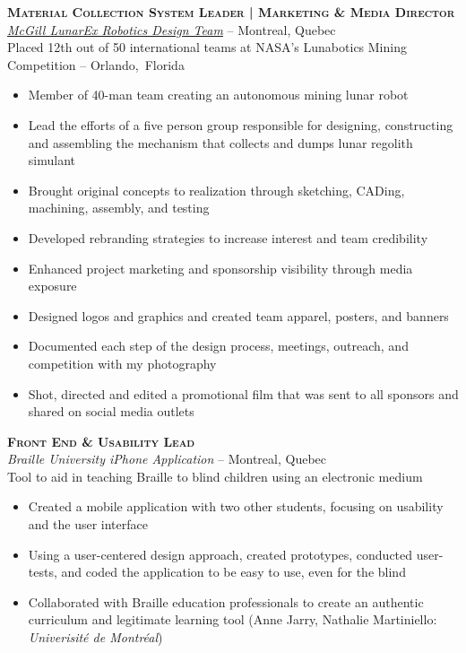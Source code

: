 \documentclass[12pt, letterpaper]{article}
\newcommand{\years}[1]{\marginnote{\scriptsize #1}} %
\begin{document}
\clearpage

\begin{samepage}
\years{\small 8/2012 - 8/2013} \textbf{\scshape Material Collection System Leader | Marketing \& Media Director}\\
\href{http://www.lunarex.mcgill.ca}{\textit{McGill LunarEx Robotics Design Team}} -- Montreal, Quebec\\
\small Placed 12th out of 50 international teams at NASA's Lunabotics Mining Competition -- Orlando,~Florida
\begin{itemize}
\item Member of 40-man team creating an autonomous mining lunar robot 
\item Lead the efforts of a five person group responsible for designing, constructing and assembling the mechanism that collects and dumps lunar regolith simulant
\item Brought original concepts to realization through sketching, CADing, machining, assembly, and testing
\item Developed rebranding strategies to increase interest and team credibility
\item Enhanced project marketing and sponsorship visibility through media exposure
\item Designed logos and graphics and created team apparel, posters, and banners
\item Documented each step of the design process,  meetings, outreach, and competition with my photography
\item Shot, directed and edited a promotional film that was sent to all sponsors and shared on social media outlets
\end{itemize}
\end {samepage}

\begin{samepage}
\years{\small 1/2013 - 8/2013} \textbf{\scshape Front End \& Usability Lead}\\
\textit{Braille University iPhone Application} -- Montreal, Quebec\\
\small Tool to aid in teaching Braille to blind children using an electronic medium 
\begin{itemize}
\item Created a mobile application with two other students, focusing on usability and the user interface
\item Using a user-centered design approach, created prototypes, conducted user-tests, and coded the application to be easy to use, even for the blind
\item Collaborated with Braille education professionals to create an authentic curriculum and legitimate learning tool (Anne Jarry, Nathalie Martiniello: \textit {Univerisit\'e de Montr\'eal})
\end{itemize}
\end {samepage}
\end{document}
